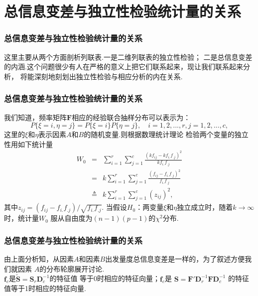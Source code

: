 \section{总信息变差与独立性检验统计量的关系}

\begin{frame}\frametitle{\color{blue}总信息变差与独立性检验统计量的关系}

\begin{large}
\quad\quad 这里主要从两个方面剖析列联表.一是二维列联表的独立性检验；
二是总信息变差的内涵.这个问题很少有人在严格的意义上把它们联系起来，现让我们联系起来分析，
将能深刻地刻划出独立性检验与相应分析的内在关系.

\end{large}
\end{frame}
\begin{frame}\frametitle{\color{blue}总信息变差与独立性检验统计量的关系}

\quad\quad {\color{magenta} {\hei 1. 二维列联表的独立性检验}}
 \vskip0.3cm
\begin{footnotesize}
我们知道，频率矩阵$\mathbf{F}$相应的经验联合抽样分布可以表示为：
$$P\{\xi=i,\eta=j\}=P\{\xi=i\}P\{\eta=j\},\quad i=1,2,...,r,  j=1,2,...,c,$$
这里的$\xi$和$\eta$表示因素$A$和$B$的随机变量.则根据数理统计理论
检验两个变量的独立性用如下统计量
\begin{eqnarray}
      W_{0}&=&\sum^{r}_{i=1}\sum^{c}_{j=1}\frac{(kf_{ij}-kf_{i.}f_{.j})^{2}}{kf_{i.}f_{.j}}  \nonumber\\
              &=&k\sum^{r}_{i=1}\sum^{c}_{j=1}\frac{(f_{ij}-f_{i.}f_{.j})^{2}}{f_{i.}f_{.j}}  \nonumber\\
              &\triangleq&k\sum^{r}_{i=1}\sum^{c}_{j=1}(z_{ij})^{2},
\end{eqnarray}
其中$z_{ij}=(f_{ij}-f_{i.}f_{.j})/\sqrt{f_{i.}f_{.j}}$.
当假设$H_{0}$：两变量$\xi$和$\eta$独立成立时，随着$k\longrightarrow\infty$时，统计量$W_{0}$
服从自由度为$(n-1)(p-1)$的$\chi^{2}$分布.
\end{footnotesize}
\end{frame}
\begin{frame}\frametitle{\color{blue}总信息变差与独立性检验统计量的关系}

\quad\quad
由上面分析知，从因素$A$和因素$B$出发量度总信息变差是一样的，为了叙述方便我们就因素
$A$的分布轮廓展开讨论.\\
\vskip0.3cm
 \quad{}
     $\mathbf{f}_{c}$是$\mathbf{\widetilde{S}}=\mathbf{S}_{r}\mathbf{D}_{c}^{-1}$的特征值
    等于0时相应的特征向量；$\mathbf{f}_{c}$是
    $\mathbf{S}=\mathbf{F}'\mathbf{D}_{r}^{-1}\mathbf{F}\mathbf{D}_{c}^{-1}$
     的特征值等于1时相应的特征向量.
\end{frame}
